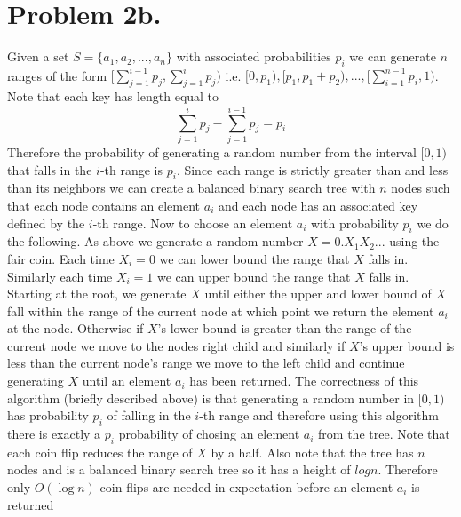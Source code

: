 \documentclass[12pt]{article}
\begin{document}
\section*{Problem 2b.}
Given a set $S = \{a_1,a_2,...,a_n\}$ with associated probabilities $p_i$ we can
generate $n$ ranges of the form
$[\sum^{i-1}_{j=1} p_j, \sum^i_{j=1} p_j)$ i.e.
$[0,p_1), [p_1, p_1 + p_2),..., [\sum^{n-1}_{i=1} p_i, 1)$. Note that each key
has length equal to
$$\sum^i_{j=1} p_j - \sum^{i-1}_{j=1} p_j = p_i$$
Therefore the probability of generating a random number from the interval
$[0,1)$ that falls in the $i$-th range is $p_i$. Since each range is strictly
greater than and less than its neighbors we can create a balanced binary search tree
with $n$ nodes such that each node contains an element $a_i$ and each node has
an associated key defined by the $i$-th range. Now to choose an element $a_i$
with probability $p_i$ we do the following. As above we generate a random number
$X = 0.X_1X_2...$ using the fair coin. Each time $X_i = 0$ we can lower bound
the range that $X$ falls in. Similarly each time $X_i = 1$ we can upper bound
the range that $X$ falls in. Starting at the root, we generate $X$ until either
the upper and lower bound of $X$ fall within the range of the current node
at which point we return the element $a_i$ at the node. Otherwise if $X$'s lower
bound is greater than the range of the current node we move to the nodes right
child and similarly if $X$'s upper bound is less than the current node's range
we move to the left child and continue generating $X$ until an element $a_i$
has been returned. The correctness of this algorithm (briefly described above)
is that generating a random number in $[0,1)$ has probability $p_i$ of falling
in the $i$-th range and therefore using this algorithm there is exactly a $p_i$
probability of chosing an element $a_i$ from the tree. Note that each coin flip
reduces the range of $X$ by a half. Also note that the tree has $n$ nodes and is
a balanced binary search tree so it has a height of $log n$. Therefore only
$O(\log n)$ coin flips are needed in expectation before an element $a_i$ is
returned
\end{document}
